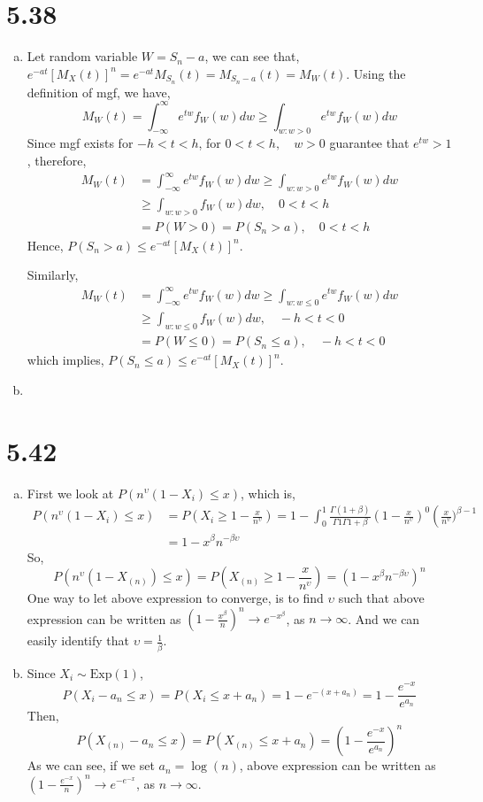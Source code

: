 \documentclass[letterpaper]{article}
\newcommand{\intii}{\int_{-\infty}^\infty}
\newcommand{\Xn}{X_{(n)}}
\begin{document}
\section*{5.38}
\begin{enumerate}[(a)]
\item Let random variable $W = S_n - a$, we can see that, $e^{-at}[M_X(t)]^n = e^{-at}M_{S_n}(t) = M_{S_n - a}(t) = M_W(t)$. Using the definition of mgf, we have,
\[
M_W(t) = \intii e^{tw} f_W(w) dw \ge \int_{w: w >0} e^{tw} f_W(w) dw
\]
Since mgf exists for $-h < t < h$, for $0 < t < h, \quad w > 0$ guarantee that $e^{tw} > 1$, therefore,
\begin{align*}
M_W(t) & = \intii e^{tw} f_W(w) dw \ge \int_{w: w >0} e^{tw} f_W(w) dw \\
 & \ge \int_{w: w>0} f_W(w) dw, \quad 0 < t < h \\
 & = P(W > 0) = P(S_n > a), \quad 0 < t < h
\end{align*}
Hence, $P(S_n > a) \le e^{-at}[M_X(t)]^n$.

Similarly,
\begin{align*}
M_W(t) & = \intii e^{tw} f_W(w) dw \ge \int_{w: w \le 0} e^{tw} f_W(w) dw \\
 & \ge \int_{w: w \le 0} f_W(w) dw, \quad -h < t < 0 \\
 & = P(W \le 0) = P(S_n \le a), \quad -h < t < 0
\end{align*}
which implies, $P(S_n \le a) \le e^{-at}[M_X(t)]^n$.
\item 
\end{enumerate}
\section*{5.42}
\begin{enumerate}[(a)]
\item First we look at $P(n^{\upsilon}(1-X_i) \le x)$, which is,
\begin{align*}
P(n^{\upsilon}(1-X_i) \le x) & = P(X_i \ge 1 - \frac{x}{n^\upsilon}) = 1-\int_0^1 \frac{\Gamma(1+\beta)}{\Gamma{1}\Gamma{1+\beta}} \left(1-\frac{x}{n^\upsilon}\right)^0 \left(\frac{x}{n^\upsilon})^{\beta-1} \\
& = 1 - x^\beta n^{-\beta\upsilon} 
\end{align*}
So, 
\[
P(n^{\upsilon}(1-\Xn) \le x) = P(\Xn \ge 1 - \frac{x}{n^\upsilon}) = (1- x^\beta n^{-\beta\upsilon})^n
\]
One way to let above expression to converge, is to find $\upsilon$ such that above expression can be written as $(1-\frac{x^\beta}{n})^n \to e^{-x^\beta}$, as $n\to\infty$. And we can easily identify that $\upsilon = \frac{1}{\beta}$.
\item Since $X_i \sim \text{Exp}(1)$,
\[
P(X_i - a_n \le x) = P(X_i \le x + a_n) = 1 - e^{-(x+a_n)} = 1 - \frac{e^{-x}}{e^{a_n}}
\]
Then,
\[
P(\Xn - a_n \le x) = P(\Xn \le x + a_n) = \left(1-\frac{e^{-x}}{e^{a_n}}\right)^n
\]
As we can see, if we set $a_n = \log(n)$, above expression can be written as $\left(1-\frac{e^{-x}}{n}\right)^n \to e^{-e^{-x}}$, as $n \to \infty$.
\end{enumerate}
\end{document}
